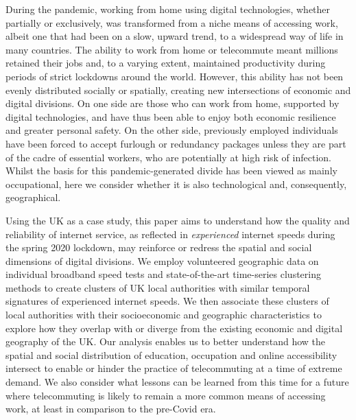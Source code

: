 \documentclass[Royal,times,sageh]{sagej}
\begin{document}
During the pandemic, working from home using digital technologies,
whether partially or exclusively, was transformed from a niche means of
accessing work, albeit one that had been on a slow, upward trend, to a
widespread way of life in many countries. The ability to work from home
or telecommute meant millions retained their jobs and, to a varying
extent, maintained productivity during periods of strict lockdowns
around the world. However, this ability has not been evenly distributed
socially or spatially, creating new intersections of economic and
digital divisions. On one side are those who can work from home,
supported by digital technologies, and have thus been able to enjoy both
economic resilience and greater personal safety. On the other side,
previously employed individuals have been forced to accept furlough or
redundancy packages unless they are part of the cadre of essential
workers, who are potentially at high risk of infection. Whilst the basis
for this pandemic-generated divide has been viewed as mainly
occupational, here we consider whether it is also technological and,
consequently, geographical.

Using the UK as a case study, this paper aims to understand how the
quality and reliability of internet service, as reflected in
\emph{experienced} internet speeds during the spring 2020 lockdown, may
reinforce or redress the spatial and social dimensions of digital
divisions. We employ volunteered geographic data on individual broadband
speed tests and state-of-the-art time-series clustering methods to
create clusters of UK local authorities with similar temporal signatures
of experienced internet speeds. We then associate these clusters of
local authorities with their socioeconomic and geographic
characteristics to explore how they overlap with or diverge from the
existing economic and digital geography of the UK. Our analysis enables
us to better understand how the spatial and social distribution of
education, occupation and online accessibility intersect to enable or
hinder the practice of telecommuting at a time of extreme demand. We
also consider what lessons can be learned from this time for a future
where telecommuting is likely to remain a more common means of accessing
work, at least in comparison to the pre-Covid era.
\end{document}
